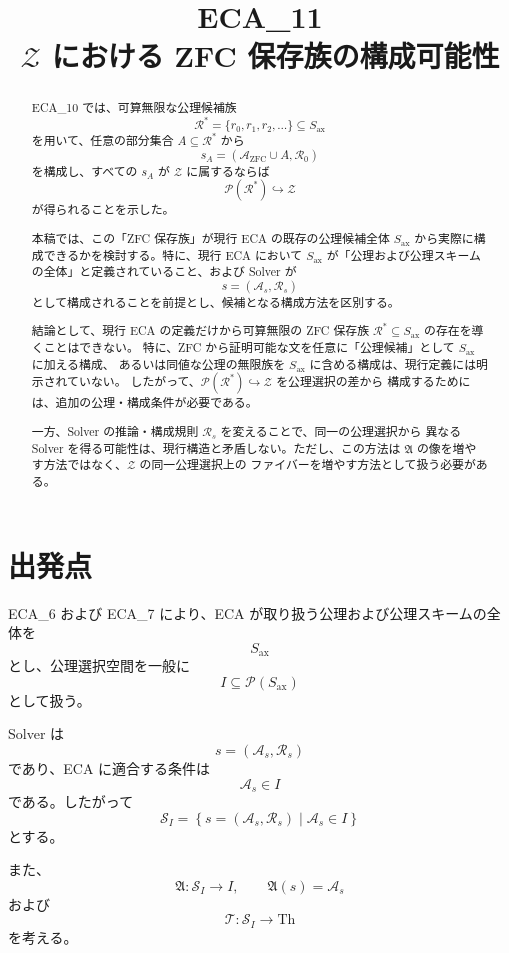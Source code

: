 \documentclass[a4paper,11pt]{jsarticle}
\title{ECA_11\\
$\mathcal{Z}$ における ZFC 保存族の構成可能性}
\author{}
\date{}
\newcommand{\Solver}{\mathcal{S}}
\newcommand{\Ax}{S_{\mathrm{ax}}}
\newcommand{\Sel}{I}
\newcommand{\Th}{\mathrm{Th}}
\begin{document}
\maketitle

\begin{abstract}
ECA_10 では、可算無限な公理候補族
\[
\mathcal{R}^{*}=\{r_0,r_1,r_2,\ldots\}\subseteq\Ax
\]
を用いて、任意の部分集合 $A\subseteq\mathcal{R}^{*}$ から
\[
s_A=
\left(
\mathcal{A}_{\mathrm{ZFC}}\cup A,\mathcal{R}_0
\right)
\]
を構成し、すべての $s_A$ が $\mathcal{Z}$ に属するならば
\[
\mathcal{P}(\mathcal{R}^{*})\hookrightarrow\mathcal{Z}
\]
が得られることを示した。

本稿では、この「ZFC 保存族」が現行 ECA の既存の公理候補全体
$\Ax$ から実際に構成できるかを検討する。特に、現行 ECA において
$\Ax$ が「公理および公理スキームの全体」と定義されていること、および
Solver が
\[
s=(\mathcal{A}_s,\mathcal{R}_s)
\]
として構成されることを前提とし、候補となる構成方法を区別する。

結論として、現行 ECA の定義だけから可算無限の ZFC 保存族
$\mathcal{R}^{*}\subseteq\Ax$ の存在を導くことはできない。
特に、ZFC から証明可能な文を任意に「公理候補」として $\Ax$ に加える構成、
あるいは同値な公理の無限族を $\Ax$ に含める構成は、現行定義には明示されていない。
したがって、$\mathcal{P}(\mathcal{R}^{*})\hookrightarrow\mathcal{Z}$ を公理選択の差から
構成するためには、追加の公理・構成条件が必要である。

一方、Solver の推論・構成規則 $\mathcal{R}_s$ を変えることで、同一の公理選択から
異なる Solver を得る可能性は、現行構造と矛盾しない。ただし、この方法は
$\mathfrak{A}$ の像を増やす方法ではなく、$\mathcal{Z}$ の同一公理選択上の
ファイバーを増やす方法として扱う必要がある。
\end{abstract}

\section{出発点}

ECA_6 および ECA_7 により、ECA が取り扱う公理および公理スキームの全体を
\[
\Ax
\]
とし、公理選択空間を一般に
\[
\Sel\subseteq\mathcal{P}(\Ax)
\]
として扱う。

Solver は
\[
s=(\mathcal{A}_s,\mathcal{R}_s)
\]
であり、ECA に適合する条件は
\[
\mathcal{A}_s\in\Sel
\]
である。したがって
\[
\Solver_{\Sel}
=
\left\{
s=(\mathcal{A}_s,\mathcal{R}_s)
\mid
\mathcal{A}_s\in\Sel
\right\}
\]
とする。

また、
\[
\mathfrak{A}:\Solver_{\Sel}\longrightarrow\Sel,
\qquad
\mathfrak{A}(s)=\mathcal{A}_s
\]
および
\[
\mathcal{T}:\Solver_{\Sel}\longrightarrow\Th
\]
を考える。
\end{document}
